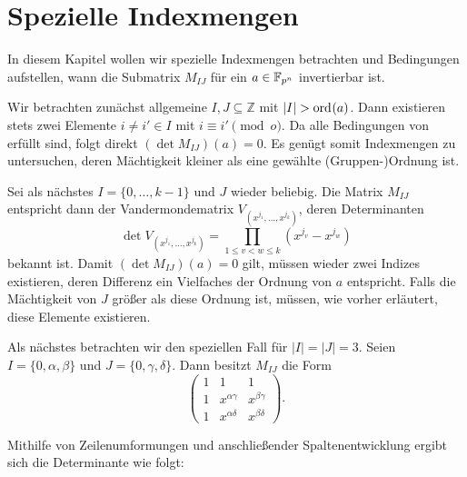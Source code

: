 \section{Spezielle Indexmengen}


In diesem Kapitel wollen wir spezielle Indexmengen betrachten und Bedingungen aufstellen, wann die Submatrix $M_{IJ}$ für ein $a \in \field{p}[n]$ invertierbar ist. 

Wir betrachten zunächst allgemeine $I,J \subseteq \mathbb{Z}$ mit $|I| > \ord{a}$. Dann existieren stets zwei Elemente $i \ne i' \in I$ mit $i \equiv i' \pmod{o}$. Da alle Bedingungen von  erfüllt sind, folgt direkt $(\det M_{IJ})(a) = 0$. Es genügt somit Indexmengen zu untersuchen, deren Mächtigkeit kleiner als eine gewählte (Gruppen-)Ordnung ist.

Sei als nächstes $I = \{0,\dots,k-1\}$ und $J$ wieder beliebig. Die Matrix $M_{IJ}$ entspricht dann der Vandermondematrix $V_{(x^{j_1},\dots,x^{j_k})}$, deren Determinanten
\begin{equation*}
    \det V_{(x^{j_1},\dots,x^{j_k})} = \prod_{1\leq v<w\leq k} (x^{j_v} - x^{j_w})
\end{equation*}
bekannt ist. Damit $(\det M_{IJ})(a) = 0$ gilt, müssen wieder zwei Indizes existieren, deren Differenz ein Vielfaches der Ordnung von $a$ entspricht. Falls die Mächtigkeit von $J$ größer als diese Ordnung ist, müssen, wie vorher erläutert, diese Elemente existieren.

Als nächstes betrachten wir den speziellen Fall für $|I| = |J| = 3$. Seien $I = \{0, \alpha, \beta\}$ und $J = \{0, \gamma, \delta\}$. Dann besitzt $M_{IJ}$ die Form 
\begin{equation*}
    \begin{pmatrix}
        1 & 1 & 1 \\
        1 & x^{\alpha\gamma} & x^{\beta\gamma} \\
        1 & x^{\alpha\delta} & x^{\beta\delta}
    \end{pmatrix}.
\end{equation*}

Mithilfe von Zeilenumformungen und anschließender Spaltenentwicklung ergibt sich die Determinante wie folgt:

